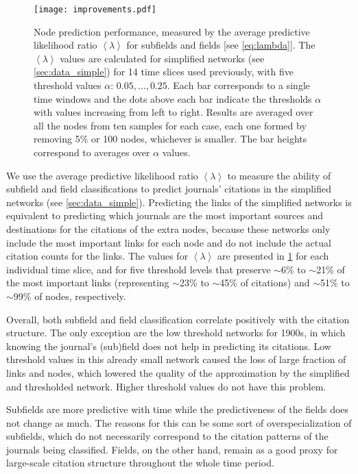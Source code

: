 \documentclass[a4paper,12pt]{article}
\newcommand{\avg}[1]{{\left<#1\right>}}
\begin{document}
\begin{figure}
      \centering
      \texttt{[image: improvements.pdf]}
      \caption{Node prediction performance, measured by the average predictive likelihood 
ratio $\avg{\lambda}$ for subfields and fields [see \protect\cref{eq:lambda}]. The $\avg{\lambda}$ values are 
calculated for simplified networks (see \cref{sec:data_simple}) for 14 time slices used previously, with five  
threshold values $\alpha$: $0.05,\ldots,0.25$. Each bar corresponds to a single time windows and the dots above 
each bar indicate the thresholds $\alpha$ with values increasing from left to right. 
Results are averaged over all the nodes 
from ten samples for each case, each one formed by removing 5\% or 100 nodes, whichever is 
smaller. The bar heights correspond to averages over
$\alpha$ values.}
  \label{fig:improvements}
\end{figure}


We use the average predictive likelihood ratio $\avg{\lambda}$ to measure the ability of subfield 
and field classifications to predict journals' citations in the simplified networks (see \cref{sec:data_simple}).
Predicting the links of the simplified networks is equivalent to predicting which journals are the most important sources and destinations for the 
citations of the extra nodes, because these networks only include the most important links for each node and do not include the actual
citation counts for the links.
 The values for $\avg{\lambda}$ are presented in \cref{fig:improvements} for each individual time 
slice, and for five threshold levels that preserve $\sim$6\% to $\sim$21\% of the most important links 
(representing $\sim$23\% to $\sim$45\% of citations) and $\sim$51\% to $\sim$99\% of 
nodes, respectively. 



Overall, both subfield and field classification correlate positively with the citation 
structure. The only exception are the low threshold networks for 1900s, in which knowing 
the journal's (sub)field does not help in predicting its citations. Low threshold values in 
this already small network caused the loss of large fraction of links and nodes, which 
lowered the quality of the approximation by the simplified and thresholded network. 
Higher threshold values do not have this problem.


Subfields are more predictive with time while the predictiveness 
of the fields does not change as much. The reasons for this can be some sort of 
overspecialization of subfields, which do not 
necessarily correspond to the citation patterns of the journals being classified. Fields, 
on the other hand, remain as a good proxy for large-scale citation structure throughout 
the whole time period.
\end{document}
